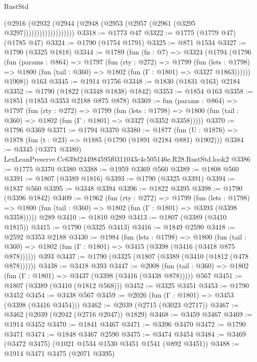 \begin{lexlean}{RustStd}
\begin{coremodule}
                          (@2916
                            (@2932
                              (@2944 (@2948 (@2953 (@2957 (@2961 (@3295 @3297)))))))))))))))))))
@3318 := @1773 @47
@3322 := @1775 (@1779 @47) (@1785 @47)
@3324 := @1790 (@1754 @1791)
@3325 := @871 @1534
@3327 := @1790 (@3325 @1818)
@3344 := @1789
    (fun (fn : @7) =>
    @3324
      (@1794
        (@1796
          (fun (params : @864) =>
          @1797
            (fun (rty : @272) =>
            @1799
              (fun (lets : @1798) =>
              @1800 (fun (tail : @360) => @1802 (fun (Γ : @1801) => @3327 @1863))))))
        @1908))
    @163
@3345 := @1914 @1756
@3348 := @1830 (@1831 @163) @2184
@3352 := @1790 (@1822 (@3348 @1838) @1842)
@3353 := @1854 @163
@3358 := @1851 (@1853 @3353 @2188 @875 @878)
@3369 := fun (params : @864) =>
  @1797
    (fun (rty : @272) =>
    @1799
      (fun (lets : @1798) =>
      @1800 (fun (tail : @360) => @1802 (fun (Γ : @1801) => @3327 (@3352 @3358)))))
@3370 := @1796 @3369
@3371 := @1794 @3370
@3380 := @1877 (fun (U : @1876) => @1878 (fun (t : @23) => @1885 (@1790 (@1891 @2184 @881) @1902)))
@3384 := @3345 (@3371 @3380) LexLeanPreserve.Cc639d244984595f0311043c4c505146e.R28.RustStd.look2
@3386 := @1775 @3370 @3380
@3388 := @1959 @3369 @560
@3389 := @1808 @560
@3391 := @1807 (@3389 @1816)
@3393 := @1790 (@3325 @3391)
@3394 := @1837 @560
@3395 := @3348 @3394
@3396 := @1822 @3395
@3398 := @1790 (@3396 @1842)
@3409 := @1962
    (fun (rty : @272) =>
    @1799
      (fun (lets : @1798) =>
      @1800 (fun (tail : @360) => @1802 (fun (Γ : @1801) => @3393 (@3398 @3358)))))
    @289
@3410 := @1810 @289
@3413 := @1807 (@3389 (@3410 @1815))
@3415 := @1790 (@3325 @3413)
@3416 := @1849 @2590
@3418 := @2592 @3353 @2188
@3430 := @1984
    (fun (lets : @1798) =>
    @1800 (fun (tail : @360) => @1802 (fun (Γ : @1801) => @3415 (@3398 (@3416 (@3418 @875 @878))))))
    @393
@3437 := @1790 (@3325 (@1807 (@3389 (@3410 (@1812 (@478 @878))))))
@3438 := @3418 @393
@3447 := @2008
    (fun (tail : @360) => @1802 (fun (Γ : @1801) => @3437 (@3398 (@3416 (@3438 @878)))))
    @567
@3451 := @1807 (@3389 (@3410 (@1812 @568)))
@3452 := @3325 @3451
@3453 := @1790 @3452
@3454 := @3438 @567
@3459 := @2026 (fun (Γ : @1801) => @3453 (@3398 (@3416 @3454)))
@3462 := @2039 (@2715 (@3023 @2717))
@3467 := @3462 (@2039 (@2042 (@2716 @2047)) @1829)
@3468 := @3459 @3467
@3469 := @1914 @3452
@3470 := @1841 @3467
@3471 := @3396 @3470
@3472 := @1790 @3471
@3474 := @1848 @3467 @2590
@3475 := @3474 @3454
@3484 := @3469 (@3472 @3475) (@1021 @1534 @1530 @3451 @1541 (@892 @3451))
@3488 := @1914 @3471 @3475 (@2071 @3395)

\end{coremodule}
\end{lexlean}
